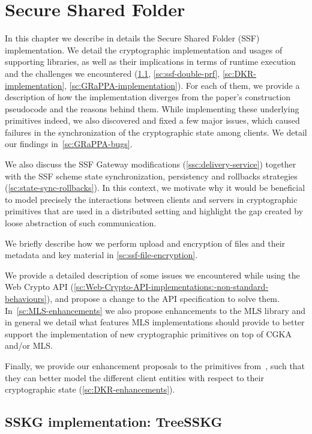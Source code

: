 \chapter{Secure Shared Folder}\label{ch:ssf}

In this chapter we describe in details the Secure Shared Folder (SSF) implementation.
We detail the cryptographic implementation and usages of supporting
libraries, as well as their implications in terms of runtime execution
and the challenges we encountered (\cref{sc:ssf-sskg}, \cref{sc:ssf-double-prf}, \cref{sc:DKR-implementation}, \cref{sc:GRaPPA-implementation}). 
For each of them, we provide a description of how the implementation diverges from
the paper's construction pseudocode and the reasons behind them.
While implementing these underlying primitives indeed, we also discovered 
and fixed a few major issues, which caused failures in the 
synchronization of the cryptographic state among clients.
We detail our findings in~\cref{sc:GRaPPA-bugs}.

We also discuss the SSF Gateway modifications 
(\cref{ssc:delivery-service})
together with the SSF scheme state synchronization, persistency and rollbacks
strategies (\cref{sc:state-sync-rollbacks}). In this context,
we motivate why it would be beneficial to model precisely the
interactions between clients and servers in cryptographic
primitives that are used in a distributed setting and highlight
the gap created by loose abstraction of such communication.

We briefly describe how we perform upload and encryption of files
and their metadata and key material in \cref{sc:ssf-file-encryption}.

We provide a detailed description of some issues we encountered
while using the Web Crypto API (\cref{sc:Web-Crypto-API-implementations:-non-standard-behaviours}),
and propose a change to the API specification to solve them.
In~\cref{sc:MLS-enhancements} we also
propose enhancements to the MLS library and in general we detail
what features MLS implementations should provide to better support
the implementation of new cryptographic primitives on top of
CGKA and/or MLS.

Finally, we provide our enhancement proposals to the primitives
from~\cite{GKP}, 
such that they can better model the different client entities with respect
to their cryptographic state (\cref{sc:DKR-enhancements}).

\section{SSKG implementation: TreeSSKG}\label{sc:ssf-sskg}

